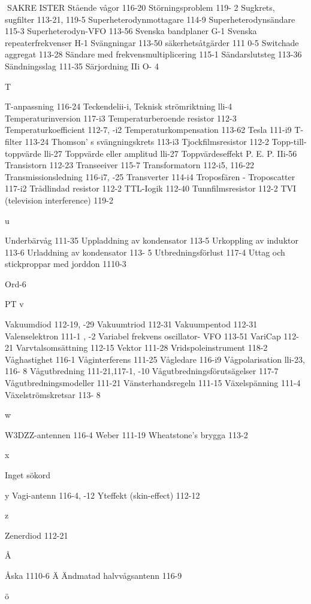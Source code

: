 \documentclass[a4paper,twoside,twocolumn,openright]{book}
\begin{document}
{{{{{{{{{{{SAKRE ISTER
Stående vågor 116-20
Störningsproblem 119- 2
Sugkrets, sugfilter 113-21, 119-5
Superheterodynmottagare 114-9
Superheterodynsändare 115-3
Superheterodyn-VFO 113-56
Svenska bandplaner G-1
Svenska repeaterfrekvenser H-1
Svängningar 113-50
säkerhetsåtgärder 111 0-5
Switchade aggregat 113-28
Sändare med frekvensmultiplicering 115-1
Sändarslutsteg 113-36
Sändningsslag 111-35
Särjordning IIi O- 4

T

T-anpassning 116-24
Teckendelii-i,
Teknisk strömriktning lli-4
Temperaturinversion 117-i3
Temperaturberoende resistor 112-3
Temperaturkoefficient 112-7, -i2
Temperaturkompensation 113-62
Tesla 111-i9
T-filter 113-24
Thomson' s svängningskrets 113-i3
Tjockfilmsresistor 112-2
Topp-till-toppvärde lli-27
Toppvärde eller amplitud lli-27
Toppvärdeseffekt P. E. P. IIi-56
Transistorn 112-23
Transeeiver 115-7
Transformatorn 112-i5, 116-22
Transmissionsledning 116-i7, -25
Transverter 114-i4
Troposfären - Troposcatter 117-i2
Trådlindad resistor 112-2
TTL-Iogik 112-40
Tunnfilmsresistor 112-2
TVI (television interference) 119-2

u

Underbärvåg 111-35
Uppladdning av kondensator 113-5
Urkoppling av induktor 113-6
Urladdning av kondensator 113- 5
Utbredningsförlust 117-4
Uttag och stickproppar med jorddon 1110-3

Ord-6

PT
v

Vakuumdiod 112-19, -29
Vakuumtriod 112-31
Vakuumpentod 112-31
Valenselektron 111-1 , -2
Variabel frekvens oscillator- VFO 113-51
VariCap 112-21
Varvtalsomsättning 112-15
Vektor 111-28
Vridspoleinstrument 118-2
Våghastighet 116-1
Våginterferens 111-25
Vågledare 116-i9
Vågpolarisation lli-23, 116- 8
Vågutbredning 111-21,117-1, -10
Vågutbredningsförutsägelser 117-7
Vågutbredningsmodeller 111-21
Vänsterhandsregeln 111-15
Växelspänning 111-4
Växelströmskretsar 113- 8

w

W3DZZ-antennen 116-4
Weber 111-19
Wheatstone's brygga 113-2

x

Inget sökord

y
Vagi-antenn 116-4, -12
Yteffekt (skin-effect) 112-12

z

Zenerdiod 112-21

Å

Åska 1110-6
Ä
Ändmatad halvvågsantenn 116-9

ö

}}}}}}}}}}}
\end{document}
